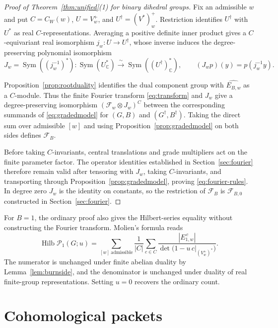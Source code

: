 \documentclass[11pt,a4paper,reqno]{amsart}
\theoremstyle{plain}
\theoremstyle{definition}
\theoremstyle{remark}
\numberwithin{equation}{section}
\DeclareMathOperator{\Sym}{Sym}
\newcommand{\CC}{\mathbb C}
\newcommand{\cP}{\mathcal P}
\begin{document}
\begin{proof}[Proof of Theorem~\ref{thm:unified}\textup{(1)} for binary dihedral groups]
Fix an admissible $w$ and put $C=C_W(w)$, $U=V_w^+$, and $U^\dagger=(V^*)_w^+$. Restriction identifies $U^\dagger$ with $U^*$ as real $C$-representations. Averaging a positive definite inner product gives a $C$-equivariant real isomorphism $j_w\colon U\to U^\dagger$, whose inverse induces the degree-preserving polynomial isomorphism
\[
J_w=\Sym((j_w^{-1})^*)\colon \Sym(U_{\CC}^*)\xrightarrow{\ \sim\ } \Sym((U^\dagger)_{\CC}^*),\qquad (J_wp)(y)=p(j_w^{-1}y).
\]

Proposition~\ref{prop:rootduality} identifies the dual component group with $\widehat{E_{B,w}}$ as a $C$-module. Thus the finite Fourier transform \eqref{eq:transform} and $J_w$ give a degree-preserving isomorphism $(\mathcal F_w\otimes J_w)^C$ between the corresponding summands of \eqref{eq:gradedmodel} for $(G,B)$ and $(G^\dagger,B^\dagger)$. Taking the direct sum over admissible $[w]$ and using Proposition~\ref{prop:gradedmodel} on both sides defines $\mathcal F_B$.

Before taking $C$-invariants, central translations and grade multipliers act on the finite parameter factor. The operator identities established in Section~\ref{sec:fourier} therefore remain valid after tensoring with $J_w$, taking $C$-invariants, and transporting through Proposition~\ref{prop:gradedmodel}, proving \eqref{eq:fourier-rules}. In degree zero $J_w$ is the identity on constants, so the restriction of $\mathcal F_B$ is $\mathcal F_{B,0}$ constructed in Section~\ref{sec:fourier}.
\end{proof}

For $B=1$, the ordinary proof also gives the Hilbert-series equality without constructing the Fourier transform. Molien's formula reads
\begin{equation}\label{eq:molien}
\operatorname{Hilb}\cP_1(G;u)= \sum_{[w]\ \mathrm{admissible}}\frac1{|C|} \sum_{c\in C}\frac{|E_{1,w}^{\,c}|}{\det\bigl(1-u\,c|_{(V_w^+)^*}\bigr)}.
\end{equation}
The numerator is unchanged under finite abelian duality by Lemma~\ref{lem:burnside}, and the denominator is unchanged under duality of real finite-group representations. Setting $u=0$ recovers the ordinary count.

\section{Cohomological packets}\label{sec:packets}
\end{document}
